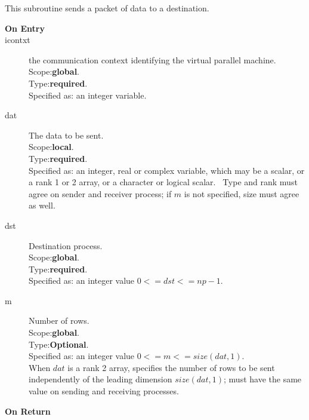 This subroutine sends a packet of data to a destination.
\begin{description}
\item[\bf  On Entry ]
\item[icontxt] the communication context identifying the virtual
  parallel machine.\\
Scope:{\bf global}.\\
Type:{\bf required}.\\
Specified as: an integer variable.
\item[dat] The data to be sent.\\
Scope:{\bf local}.\\
Type:{\bf required}.\\
Specified as: an integer, real or complex variable, which may be a
scalar, or a rank 1 or 2 array, or a character or logical scalar. \
Type and  rank must agree on sender and receiver process; if $m$ is
not specified, size must agree as well. 
\item[dst] Destination process.\\
Scope:{\bf global}.\\
Type:{\bf required}.\\
Specified as: an integer value $0<= dst <= np-1$. \\
\item[m] Number of rows.\\
Scope:{\bf global}.\\
Type:{\bf Optional}.\\
Specified as: an integer value $0<= m <= size(dat,1)$. \\
When $dat$ is a rank 2 array, specifies the number of rows to be sent
independently of the leading dimension $size(dat,1)$; must have the
same value on sending and receiving processes.
\end{description}


\begin{description}
\item[\bf On Return]
\end{description}



